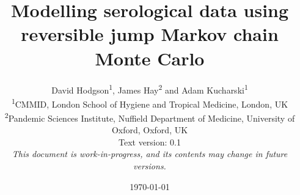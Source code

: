 \documentclass{article}
\title{Modelling serological data using reversible jump Markov chain Monte Carlo}
\author{David Hodgson\textsuperscript{1}, James Hay\textsuperscript{2} and Adam Kucharski\textsuperscript{1}\\
\small \textsuperscript{1}CMMID, London School of Hygiene and Tropical Medicine, London, UK \\
\small \textsuperscript{2}Pandemic Sciences Institute, Nuffield Department of Medicine, University of Oxford, Oxford, UK\\
\small Text version: 0.1\\
\small \textit{This document is work-in-progress, and its contents may change in future versions. }}
\date{\today}
\numberwithin{equation}{section}
\numberwithin{table}{section}
\numberwithin{algorithm}{section}
\begin{document}
\maketitle


\newpage

\newpage

\newpage

\newpage

 
\newpage
\newpage

\begin{appendices}






\end{appendices}

\newpage

\end{document}
